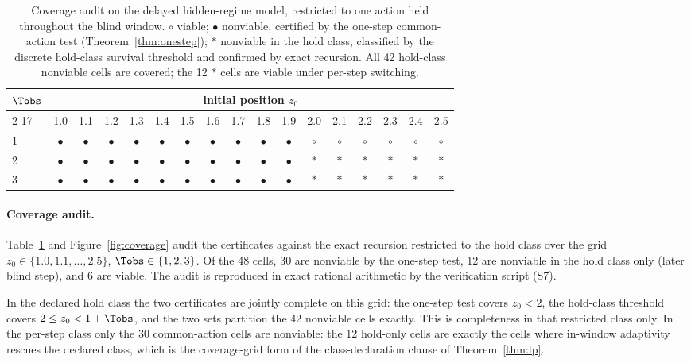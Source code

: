 \begin{table}[tb]
\centering\small
\setlength{\tabcolsep}{4.2pt}
\begin{tabular}{@{}lcccccccccccccccc@{}}
\toprule
$\Tobs$ & \multicolumn{16}{c}{initial position $z_0$}\\
\cmidrule(lr){2-17}
 & 1.0 & 1.1 & 1.2 & 1.3 & 1.4 & 1.5 & 1.6 & 1.7 & 1.8 & 1.9 & 2.0 & 2.1 & 2.2 & 2.3 & 2.4 & 2.5\\
\midrule
1 & $\bullet$ & $\bullet$ & $\bullet$ & $\bullet$ & $\bullet$ & $\bullet$ & $\bullet$ & $\bullet$ & $\bullet$ & $\bullet$ & $\circ$ & $\circ$ & $\circ$ & $\circ$ & $\circ$ & $\circ$\\
2 & $\bullet$ & $\bullet$ & $\bullet$ & $\bullet$ & $\bullet$ & $\bullet$ & $\bullet$ & $\bullet$ & $\bullet$ & $\bullet$ & $\ast$ & $\ast$ & $\ast$ & $\ast$ & $\ast$ & $\ast$\\
3 & $\bullet$ & $\bullet$ & $\bullet$ & $\bullet$ & $\bullet$ & $\bullet$ & $\bullet$ & $\bullet$ & $\bullet$ & $\bullet$ & $\ast$ & $\ast$ & $\ast$ & $\ast$ & $\ast$ & $\ast$\\
\bottomrule
\end{tabular}
\caption{Coverage audit on the delayed hidden-regime model, restricted to one action held throughout the blind window. $\circ$ viable; $\bullet$ nonviable, certified by the one-step common-action test (Theorem~\ref{thm:onestep}); $\ast$ nonviable in the hold class, classified by the discrete hold-class survival threshold and confirmed by exact recursion. All 42 hold-class nonviable cells are covered; the 12 $\ast$ cells are viable under per-step switching.}
\label{tab:coverage}
\end{table}

\paragraph{Coverage audit.} Table~\ref{tab:coverage} and Figure~\ref{fig:coverage} audit the certificates against the exact recursion restricted to the hold class over the grid $z_0\in\{1.0,1.1,\dots,2.5\}$, $\Tobs\in\{1,2,3\}$. Of the 48 cells, 30 are nonviable by the one-step test, 12 are nonviable in the hold class only (later blind step), and 6 are viable. The audit is reproduced in exact rational arithmetic by the verification script (S7).

\begin{remark}\label{rem:coverage}
In the declared hold class the two certificates are jointly complete on this grid: the one-step test covers $z_0<2$, the hold-class threshold covers $2\le z_0<1+\Tobs$, and the two sets partition the 42 nonviable cells exactly. This is completeness in that restricted class only. In the per-step class only the 30 common-action cells are nonviable: the 12 hold-only cells are exactly the cells where in-window adaptivity rescues the declared class, which is the coverage-grid form of the class-declaration clause of Theorem~\ref{thm:lp}.
\end{remark}

